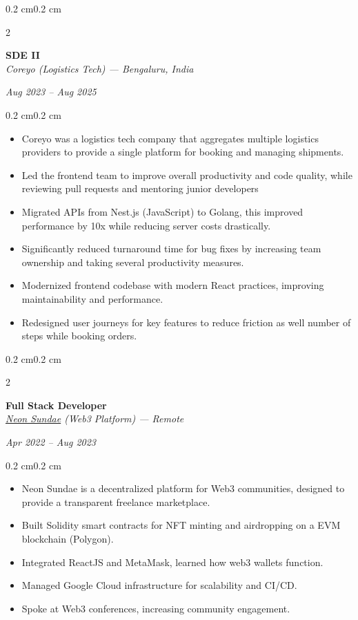 \documentclass[10pt, letterpaper]{article}
\newenvironment{highlights}{
    \begin{itemize}[
        topsep=0.10 cm,
        parsep=0.10 cm,
        partopsep=0pt,
        itemsep=0pt,
        leftmargin=0.5 cm
    ]
}{
    \end{itemize}
}
\newenvironment{onecolentry}{
    \begin{adjustwidth}{0.2 cm}{0.2 cm}
}{
    \end{adjustwidth}
}
\newenvironment{twocolentry}[2][]{
    \onecolentry
    \def\secondColumn{#2}
    \setcolumnwidth{\fill, 4.5 cm}
    \begin{paracol}{2}
}{
    \switchcolumn \raggedleft \secondColumn
    \end{paracol}
    \endonecolentry
}
\begin{document}
\begin{twocolentry}{\textit{Aug 2023 -- Aug 2025}}
    \textbf{SDE II} \\
    \textit{Coreyo (Logistics Tech) — Bengaluru, India}
\end{twocolentry}
\begin{onecolentry}
\begin{highlights}
    \item Coreyo was a logistics tech company that aggregates multiple logistics providers to provide a single platform for booking and managing shipments.
    \item Led the frontend team to improve overall productivity and code quality, while reviewing pull requests and mentoring junior developers
    \item Migrated APIs from Nest.js (JavaScript) to Golang, this improved performance by 10x while reducing server costs drastically.
    \item Significantly reduced turnaround time for bug fixes by increasing team ownership and taking several productivity measures. 
    \item Modernized frontend codebase with modern React practices, improving maintainability and performance.
    \item Redesigned user journeys for key features to reduce friction as well number of steps while booking orders. 
\end{highlights}
\end{onecolentry}

\vspace{0.2cm}

\begin{twocolentry}{\textit{Apr 2022 -- Aug 2023}}
    \textbf{Full Stack Developer} \\
    \textit{\href{https://app.neonsundae.xyz/}{Neon Sundae} (Web3 Platform) — Remote}
\end{twocolentry}
\begin{onecolentry}
\begin{highlights}
    \item Neon Sundae is a decentralized platform for Web3 communities, designed to provide a transparent freelance marketplace.
    \item Built Solidity smart contracts for NFT minting and airdropping on a EVM blockchain (Polygon).
    \item Integrated ReactJS and MetaMask, learned how web3 wallets function.
    \item Managed Google Cloud infrastructure for scalability and CI/CD.
    \item Spoke at Web3 conferences, increasing community engagement.
\end{highlights}
\end{onecolentry}
\end{document}
